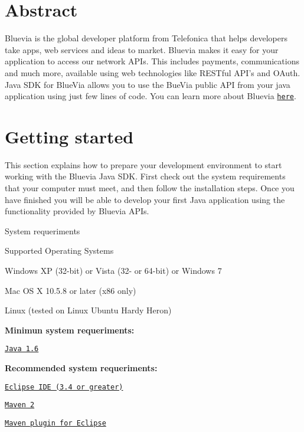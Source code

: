\hypertarget{main_developer_guide_abstract_sec}{}\section{Abstract}\label{main_developer_guide_abstract_sec}
Bluevia is the global developer platform from Telefonica that helps developers take apps, web services and ideas to market. Bluevia makes it easy for your application to access our network APIs. This includes payments, communications and much more, available using web technologies like RESTful API's and OAuth. Java SDK for BlueVia allows you to use the BueVia public API from your java application using just few lines of code. You can learn more about Bluevia \href{www.bluevia.com}{\tt here}.\hypertarget{main_getting_started_sec}{}\section{Getting started}\label{main_getting_started_sec}
This section explains how to prepare your development environment to start working with the Bluevia Java SDK. First check out the system requirements that your computer must meet, and then follow the installation steps. Once you have finished you will be able to develop your first Java application using the functionality provided by Bluevia APIs.

System requeriments

Supported Operating Systems


\begin{DoxyItemize}
\item Windows XP (32-\/bit) or Vista (32-\/ or 64-\/bit) or Windows 7 
\item Mac OS X 10.5.8 or later (x86 only) 
\item Linux (tested on Linux Ubuntu Hardy Heron) 
\end{DoxyItemize}

{\bfseries Minimun system requeriments:}


\begin{DoxyItemize}
\item \href{http://www.oracle.com/technetwork/java/javase/downloads/index.html}{\tt Java 1.6} 
\end{DoxyItemize}

{\bfseries Recommended system requeriments:}


\begin{DoxyItemize}
\item \href{http://www.eclipse.org/}{\tt Eclipse IDE (3.4 or greater)} 
\item \href{http://maven.apache.org/}{\tt Maven 2} 
\item \href{http://maven.apache.org/eclipse-plugin.html}{\tt Maven plugin for Eclipse} 
\end{DoxyItemize}


